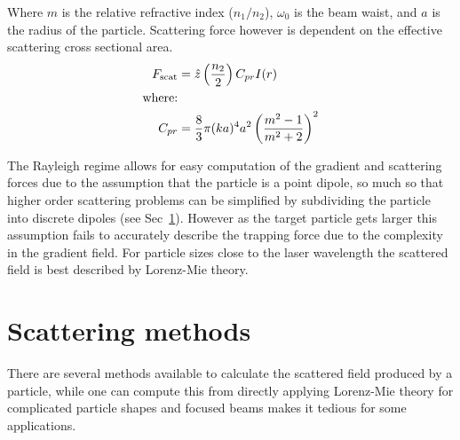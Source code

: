 Where $m$ is the relative refractive index ($n_1/n_2$), $\omega_0$ is 
the beam waist, and $a$ is the radius of the particle. Scattering force 
however is dependent on the effective scattering cross sectional area. 
\begin{align}
  F_{\rm scat}
  &= \hat{z} \left(\frac{n_2}{2}\right) C_{pr} I(r) \\
  \text{where:} \nonumber \\
  C_{pr} &= \frac{8}{3} \pi (ka)^4 a^2 \left(\frac{m^2-1}{m^2+2}\right)^2
\end{align}

The Rayleigh regime allows for easy computation of the gradient and 
scattering forces due to the assumption that the particle is a point 
dipole, so much so that higher order scattering problems can be 
simplified by subdividing the particle into discrete dipoles (see 
Sec~\ref{sec:scattering}). However as the target particle gets larger 
this assumption fails to accurately describe the trapping force due 
to the complexity in the gradient field. For particle sizes close to 
the laser wavelength the scattered field is best described by Lorenz-Mie theory. 


\section{Scattering methods}
\label{sec:scattering}
There are several methods available to calculate the scattered field 
produced by a particle, while one can compute this from directly applying
Lorenz-Mie theory for complicated particle shapes and focused beams makes it 
tedious for some applications.  
